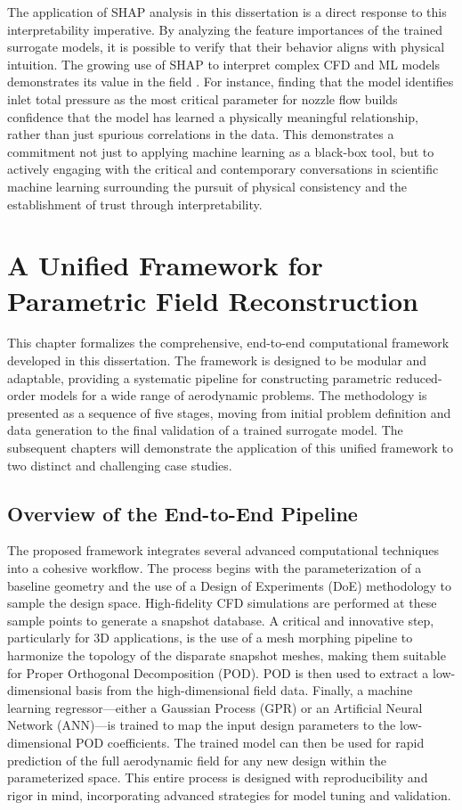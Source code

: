 \documentclass[dsc, EN]{ufabcFHZh}
\begin{document}
The application of SHAP analysis in this dissertation is a direct response to this interpretability imperative. By analyzing the feature importances of the trained surrogate models, it is possible to verify that their behavior aligns with physical intuition. The growing use of SHAP to interpret complex CFD and ML models demonstrates its value in the field \citep{crispo2023reduced, lundberg2017unified, molnar2022interpretable}. For instance, finding that the model identifies inlet total pressure as the most critical parameter for nozzle flow builds confidence that the model has learned a physically meaningful relationship, rather than just spurious correlations in the data. This demonstrates a commitment not just to applying machine learning as a black-box tool, but to actively engaging with the critical and contemporary conversations in scientific machine learning surrounding the pursuit of physical consistency and the establishment of trust through interpretability.

\chapter{A Unified Framework for Parametric Field Reconstruction}

This chapter formalizes the comprehensive, end-to-end computational framework developed in this dissertation. The framework is designed to be modular and adaptable, providing a systematic pipeline for constructing parametric reduced-order models for a wide range of aerodynamic problems. The methodology is presented as a sequence of five stages, moving from initial problem definition and data generation to the final validation of a trained surrogate model. The subsequent chapters will demonstrate the application of this unified framework to two distinct and challenging case studies.

\section{Overview of the End-to-End Pipeline}

The proposed framework integrates several advanced computational techniques into a cohesive workflow. The process begins with the parameterization of a baseline geometry and the use of a Design of Experiments (DoE) methodology to sample the design space. High-fidelity CFD simulations are performed at these sample points to generate a snapshot database. A critical and innovative step, particularly for 3D applications, is the use of a mesh morphing pipeline to harmonize the topology of the disparate snapshot meshes, making them suitable for Proper Orthogonal Decomposition (POD). POD is then used to extract a low-dimensional basis from the high-dimensional field data. Finally, a machine learning regressor—either a Gaussian Process (GPR) or an Artificial Neural Network (ANN)—is trained to map the input design parameters to the low-dimensional POD coefficients. The trained model can then be used for rapid prediction of the full aerodynamic field for any new design within the parameterized space. This entire process is designed with reproducibility and rigor in mind, incorporating advanced strategies for model tuning and validation.
\end{document}
